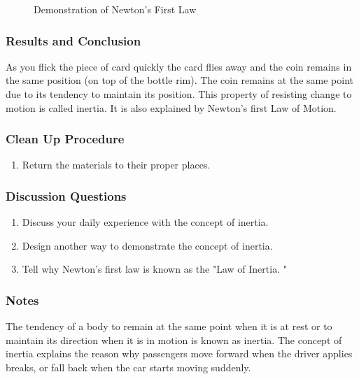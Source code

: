 \begin{figure}
\begin{center}
\def\svgwidth{2cm}

\caption{Demonstration of Newton's First Law}
\label{fig:inertia}
\end{center}
\end{figure}

\subsubsection*{Results and Conclusion}
As you flick the piece of card quickly the card flies away and the coin remains in the same position (on top of the bottle rim). The coin remains at the same point due to its tendency to maintain its position. This property of resisting change to motion is called inertia. It is also explained by Newton's first Law of Motion.  

\subsubsection*{Clean Up Procedure}
\begin{enumerate}
\item{Return the materials to their proper places.} 
\end{enumerate}

\subsubsection*{Discussion Questions}
\begin{enumerate}
\item{Discuss your daily experience with the concept of inertia.} 
\item{Design another way to demonstrate the concept of inertia.} 
\item{Tell why Newton's first law is known as the "Law of Inertia.  "}
\end{enumerate}

\subsubsection*{Notes}
The tendency of a body to remain at the same point when it is at rest or to maintain its direction when it is in motion is known as inertia. The concept of inertia explains the reason why passengers move forward when the driver applies breaks, or fall back when the car starts moving suddenly.
